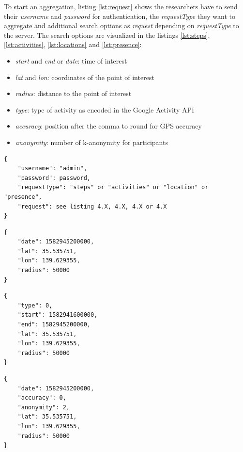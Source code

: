 To start an aggregation, listing \ref{lst:request} shows the researchers have to send their \textit{username} and \textit{password} for authentication, the \textit{requestType} they want to aggregate and additional search options as \textit{request} depending on \textit{requestType} to the server. The search options are visualized in the listings \ref{lst:steps}, \ref{lst:activities}, \ref{lst:locations} and \ref{lst:presence}:
\begin{itemize}
    \item \textit{start} and \textit{end} or \textit{date}: time of interest
    \item \textit{lat} and \textit{lon}: coordinates of the point of interest
    \item \textit{radius}: distance to the point of interest
    \item \textit{type}: type of activity as encoded in the Google Activity API
    \item \textit{accuracy}: position after the comma to round for GPS accuracy
    \item \textit{anonymity}: number of k-anonymity for participants
\end{itemize}

\begin{lstlisting}[caption=Initial aggregation request from researcher, label={lst:request}]
{
    "username": "admin",
    "password": password,
    "requestType": "steps" or "activities" or "location" or "presence",
    "request": see listing 4.X, 4.X, 4.X or 4.X
}
\end{lstlisting}

\begin{lstlisting}[caption=Search options for steps, label={lst:steps}]
{
    "date": 1582945200000,
    "lat": 35.535751,
    "lon": 139.629355,
    "radius": 50000
}
\end{lstlisting}

\begin{lstlisting}[caption=Search options for activities, label={lst:activities}]
{
    "type": 0,
    "start": 1582941600000,
    "end": 1582945200000,
    "lat": 35.535751,
    "lon": 139.629355,
    "radius": 50000
}
\end{lstlisting}

\begin{lstlisting}[caption=Search options for locations, label={lst:locations}]
{
    "date": 1582945200000,
    "accuracy": 0,
    "anonymity": 2,
    "lat": 35.535751,
    "lon": 139.629355,
    "radius": 50000
}
\end{lstlisting}

